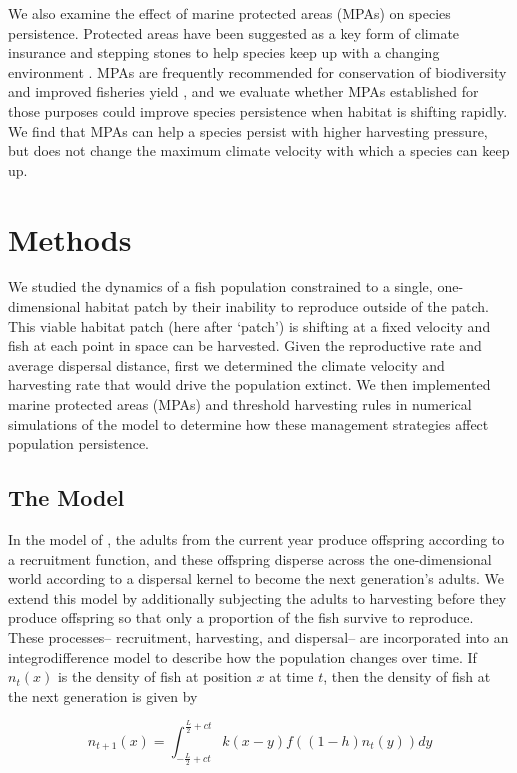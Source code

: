 \documentclass[12pt,english]{article}
\begin{document}
\begin{spacing}{1.9}
\begin{flushleft}
We also examine the effect of marine protected areas (MPAs) on species persistence. Protected areas have been suggested as a key form of climate insurance and stepping stones to help species keep up with a changing environment \citep{Thomasetal2012, Hannahetal2007}. MPAs are frequently recommended for conservation of biodiversity and improved fisheries yield \citep{Gainesetal2010}, and we evaluate whether MPAs established for those purposes could improve species persistence when habitat is shifting rapidly. We find that MPAs can help a species persist with higher harvesting pressure, but does not change the maximum climate velocity with which a species can keep up.

\section{Methods}

We studied the dynamics of a fish population constrained to a single, one-dimensional habitat patch by their inability to reproduce outside of the patch.  This viable habitat patch (here after `patch') is shifting at a fixed velocity and fish at each point in space can be harvested.  Given the reproductive rate and average dispersal distance, first we determined the climate velocity and harvesting rate that would drive the population extinct.  We then implemented marine protected areas (MPAs) and threshold harvesting rules in numerical simulations of the model to 
determine how these management strategies affect population persistence.

\subsection{The Model }

In the model of \cite{ZhouKot2011}, the adults from the current year produce offspring according to a recruitment function, and these offspring disperse across the one-dimensional world according to a dispersal kernel to become the next generation's adults.  We extend this model by additionally subjecting the adults to harvesting before they produce offspring so that only a proportion of the fish survive to reproduce. These processes-- recruitment, harvesting, and dispersal-- are incorporated into an integrodifference model to describe how the population changes over time. If $n_t(x)$ 
is the density of fish at position $x$ at time $t$, then the density of fish at the next generation is given by

\begin{equation}
n_{t+1}(x)=\int^{\frac{L}{2}+ct}_{-\frac{L}{2}+ct}k(x-y)f((1-h)n_t(y))dy \label{integrodifference}
\end{equation}


\end{flushleft}
\end{spacing}
\end{document}

